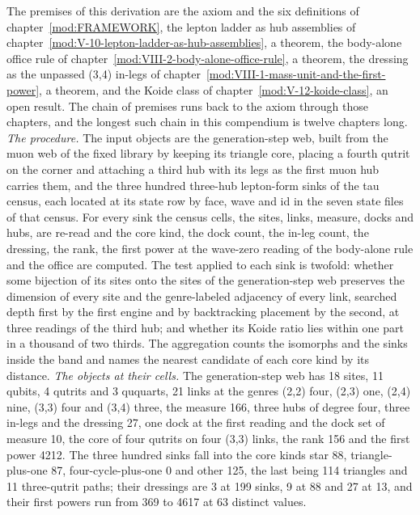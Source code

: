 \begin{chproof}
The premises of this derivation are the axiom and the six definitions of chapter~\ref{mod:FRAMEWORK}, the lepton ladder as hub assemblies of chapter~\ref{mod:V-10-lepton-ladder-as-hub-assemblies}, a theorem, the body-alone office rule of chapter~\ref{mod:VIII-2-body-alone-office-rule}, a theorem, the dressing as the unpassed (3,4) in-legs of chapter~\ref{mod:VIII-1-mass-unit-and-the-first-power}, a theorem, and the Koide class of chapter~\ref{mod:V-12-koide-class}, an open result. The chain of premises runs back to the axiom through those chapters, and the longest such chain in this compendium is twelve chapters long.
\textit{The procedure.} The input objects are the generation-step web, built from the muon web of the fixed library by keeping its triangle core, placing a fourth qutrit on the corner and attaching a third hub with its legs as the first muon hub carries them, and the three hundred three-hub lepton-form sinks of the tau census, each located at its state row by face, wave and id in the seven state files of that census. For every sink the census cells, the sites, links, measure, docks and hubs, are re-read and the core kind, the dock count, the in-leg count, the dressing, the rank, the first power at the wave-zero reading of the body-alone rule and the office are computed. The test applied to each sink is twofold: whether some bijection of its sites onto the sites of the generation-step web preserves the dimension of every site and the genre-labeled adjacency of every link, searched depth first by the first engine and by backtracking placement by the second, at three readings of the third hub; and whether its Koide ratio lies within one part in a thousand of two thirds. The aggregation counts the isomorphs and the sinks inside the band and names the nearest candidate of each core kind by its distance.
\textit{The objects at their cells.} The generation-step web has 18 sites, 11 qubits, 4 qutrits and 3 ququarts, 21 links at the genres (2,2) four, (2,3) one, (2,4) nine, (3,3) four and (3,4) three, the measure 166, three hubs of degree four, three in-legs and the dressing 27, one dock at the first reading and the dock set of measure 10, the core of four qutrits on four (3,3) links, the rank 156 and the first power 4212. The three hundred sinks fall into the core kinds star 88, triangle-plus-one 87, four-cycle-plus-one 0 and other 125, the last being 114 triangles and 11 three-qutrit paths; their dressings are 3 at 199 sinks, 9 at 88 and 27 at 13, and their first powers run from 369 to 4617 at 63 distinct values.

\end{chproof}
